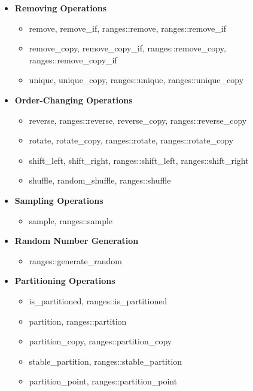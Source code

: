 \documentclass{article}
\begin{document}
\begin{itemize}
\begin{itemize}
          \end{itemize}
        \item \textbf{Removing Operations}
          \begin{itemize}
            \item remove, remove\_if, ranges::remove, ranges::remove\_if
            \item remove\_copy, remove\_copy\_if, ranges::remove\_copy, ranges::remove\_copy\_if
            \item unique, unique\_copy, ranges::unique, ranges::unique\_copy
          \end{itemize}
        \item \textbf{Order-Changing Operations}
          \begin{itemize}
            \item reverse, ranges::reverse, reverse\_copy, ranges::reverse\_copy
            \item rotate, rotate\_copy, ranges::rotate, ranges::rotate\_copy
            \item shift\_left, shift\_right, ranges::shift\_left, ranges::shift\_right
            \item shuffle, random\_shuffle, ranges::shuffle
          \end{itemize}
        \item \textbf{Sampling Operations}
          \begin{itemize}
            \item sample, ranges::sample
          \end{itemize}
        \item \textbf{Random Number Generation}
          \begin{itemize}
            \item ranges::generate\_random
          \end{itemize}
        \item \textbf{Partitioning Operations}
          \begin{itemize}
            \item is\_partitioned, ranges::is\_partitioned
            \item partition, ranges::partition
            \item partition\_copy, ranges::partition\_copy
            \item stable\_partition, ranges::stable\_partition
            \item partition\_point, ranges::partition\_point
          \end{itemize}

\end{itemize}
\end{document}
